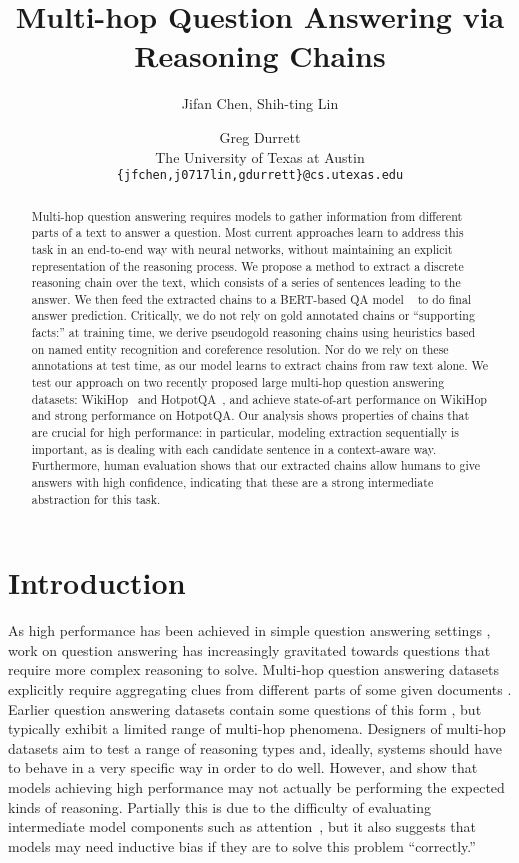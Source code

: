 \documentclass[11pt,a4paper]{article}
\title{Multi-hop Question Answering via \\  Reasoning Chains}
\author{Jifan Chen, Shih-ting Lin \and Greg Durrett \\
  The University of Texas at Austin \\
  {\tt \{jfchen,j0717lin,gdurrett\}@cs.utexas.edu}}
\date{}
\begin{document}
\maketitle
\begin{abstract}
Multi-hop question answering requires models to gather information from different parts of a text to answer a question. Most current approaches learn to address this task in an end-to-end way with neural networks, without maintaining an explicit representation of the reasoning process. We propose a method to extract a discrete reasoning chain over the text, which consists of a series of sentences leading to the answer. We then feed the extracted chains to a BERT-based QA model ~\citep{devlin2018bert} to do final answer prediction. Critically, we do not rely on gold annotated chains or ``supporting facts:'' at training time, we derive pseudogold reasoning chains using heuristics based on named entity recognition and coreference resolution. Nor do we rely on these annotations at test time, as our model learns to extract chains from raw text alone.  We test our approach on two recently proposed large multi-hop question answering datasets: WikiHop~\citep{welbl2018constructing} and HotpotQA~\citep{yang2018hotpotqa}, and achieve state-of-art performance on WikiHop and strong performance on HotpotQA. Our analysis shows properties of chains that are crucial for high performance: in particular, modeling extraction sequentially is important, as is dealing with each candidate sentence in a context-aware way. Furthermore, human evaluation shows that our extracted chains allow humans to give answers with high confidence, indicating that these are a strong intermediate abstraction for this task.
\end{abstract}

\section{Introduction}

As high performance has been achieved in simple question answering settings \citep{rajpurkar2016squad}, work on question answering has increasingly gravitated towards questions that require more complex reasoning to solve. Multi-hop question answering datasets explicitly require aggregating clues from different parts of some given documents \citep{dua2019drop, welbl2018constructing, yang2018hotpotqa, jansen2018worldtree, khashabi2018looking}. Earlier question answering datasets contain some questions of this form \citep{richardson2013mctest,lai2017race}, but typically exhibit a limited range of multi-hop phenomena. Designers of multi-hop datasets aim to test a range of reasoning types \citep{yang2018hotpotqa} and, ideally, systems should have to behave in a very specific way in order to do well. However,  and  show that models achieving high performance may not actually be performing the expected kinds of reasoning. Partially this is due to the difficulty of evaluating intermediate model components such as attention~\citep{jain2019attention}, but it also suggests that models may need inductive bias if they are to solve this problem ``correctly.''
\end{document}
